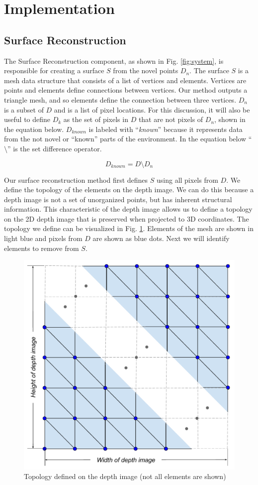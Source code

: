 \section{Implementation}

\subsection{Surface Reconstruction}
\label{subsection:surface_reconstruction}

The Surface Reconstruction component, as shown in Fig. \ref{fig:system}, is
responsible for creating a surface $S$ from the novel points $D_n$. The surface
$S$ is a mesh data structure that consists of a list of vertices and elements.
Vertices are points and elements define connections between vertices. Our method
outputs a triangle mesh, and so elements define the connection between three
vertices. $D_n$ is a subset of $D$ and is a list of pixel locations. For this
discussion, it will also be useful to define $D_k$ as the set of pixels in $D$
that are not pixels of $D_n$, shown in the equation below. $D_{known}$ is
labeled with ``\emph{known}'' because it represents data from the not novel or
``known'' parts of the environment. In the equation below ``$\setminus$'' is the
set difference operator.

\begin{equation}
D_{known} = D \setminus D_n
\end{equation}

Our surface reconstruction method first defines $S$ using all pixels from $D$.
We define the topology of the elements on the depth image. We can do this
because a depth image is not a set of unorganized points, but has inherent
structural information. This characteristic of the depth image allows us to
define a topology on the 2D depth image that is preserved when projected to 3D
coordinates. The topology we define can be visualized in Fig. \ref{fig:sr_t}.
Elements of the mesh are shown in light blue and pixels from $D$ are shown as
blue dots. Next we will identify elements to remove from $S$.

\begin{figure}[h]%
\centering
  \includegraphics[width=.70\textwidth]{figures/approach_sr_topology.pdf}
  \caption{Topology defined on the depth image (not all elements are shown)}
  \label{fig:sr_t}
\end{figure}

